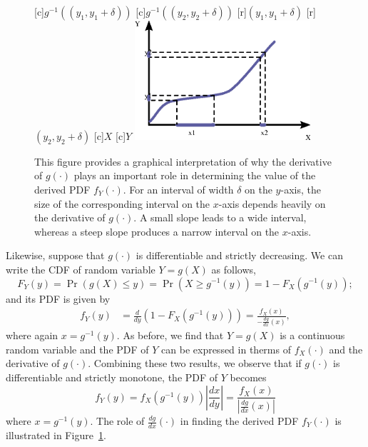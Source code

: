 \begin{figure}[ht]
\begin{center}
\begin{psfrags}
[c]{\footnotesize $g^{-1} ((y_1, y_1 + \delta))$}
[c]{\footnotesize $g^{-1} ((y_2, y_2 + \delta))$}
[r]{\footnotesize $(y_1, y_1 + \delta)$}
[r]{\footnotesize $(y_2, y_2 + \delta)$}
[c]{$X$}
[c]{$Y$}
\includegraphics[width=6.5cm]{Figures/9Chapter/Differentiable}
\end{psfrags}
\caption{This figure provides a graphical interpretation of why the derivative of $g(\cdot)$ plays an important role in determining the value of the derived PDF $f_Y(\cdot)$.
For an interval of width $\delta$ on the $y$-axis, the size of the corresponding interval on the $x$-axis depends heavily on the derivative of $g(\cdot)$.
A small slope leads to a wide interval, whereas a steep slope produces a narrow interval on the $x$-axis.}
\label{figure:DifferentiablePDF}
\end{center}
\end{figure}

Likewise, suppose that $g(\cdot)$ is differentiable and strictly decreasing.
We can write the CDF of random variable $Y = g(X)$ as follows,
\begin{equation*}
F_Y(y) = \Pr (g(X) \leq y)
= \Pr \left( X \geq g^{-1}(y) \right)
= 1 - F_X \left( g^{-1} (y) \right) ;
\end{equation*}
and its PDF is given by
\begin{equation*}
\begin{split}
f_Y (y) &= \frac{d}{dy} \left( 1 - F_X \left( g^{-1} (y) \right) \right)
= \frac{f_X (x)}{- \frac{dg}{dx}(x)} ,
\end{split}
\end{equation*}
where again $x = g^{-1} (y)$.
As before, we find that $Y = g(X)$ is a continuous random variable and the PDF of $Y$ can be expressed in therms of $f_X( \cdot)$ and the derivative of $g(\cdot)$.
Combining these two results, we observe that if $g(\cdot)$ is differentiable and strictly monotone, the PDF of $Y$ becomes
\begin{equation} \label{equation:MonotoneFunctionPDF}
f_Y (y) = f_X \left( g^{-1} (y) \right) \left| \frac{dx}{dy} \right|
= \frac{f_X (x)}{\left| \frac{dg}{dx}(x) \right|}
\end{equation}
where $x = g^{-1}(y)$.
The role of $\frac{dg}{dx} (\cdot)$ in finding the derived PDF $f_Y(\cdot)$ is illustrated in Figure~\ref{figure:DifferentiablePDF}.

